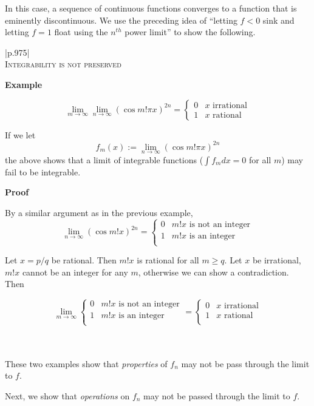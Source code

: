 \documentclass{article}
\newenvironment{myboxed}{\bigskip\noindent\begin{tabular}{|p{.975\textwidth}|}\hline \\}{\\\\\hline\end{tabular}\bigskip}
\begin{document}
In this case, a sequence of continuous functions converges to a function that is eminently discontinuous. We use the preceding idea of ``letting $f < 0$ sink and letting $f = 1$ float using the $n^{th}$ power limit'' to show the following.

\begin{myboxed}
    \textsc{Integrability is not preserved}

    \textbf{Example}

    \[\lim_{m \to \infty} \lim_{n \to \infty} (\cos m!\pi x ) ^{2n} = \begin{cases}
        0 & x\text{ irrational} \\
        1 & x\text{ rational}
    \end{cases}\]

    If we let 
    \[f_m (x) := \lim_{n \to \infty} (\cos m!\pi x)^{2n}\]
    the above shows that a limit of integrable functions ($\int f_m dx = 0$ for all $m$) may fail to be integrable.

    \textbf{Proof}

    By a similar argument as in the previous example,
    \[\lim_{n \to \infty} (\cos m!x)^{2n} = \begin{cases}
        0 & m!x\text{ is not an integer} \\
        1 & m!x\text{ is an integer} \\
    \end{cases}\]

    Let $x = p/q$ be rational. Then $m!x$ is rational for all $m \geq q$. Let $x$ be irrational, $m!x$ cannot be an integer for any $m$, otherwise we can show a contradiction. Then

    \[\lim_{m \to \infty} \begin{cases}
        0 & m!x\text{ is not an integer} \\
        1 & m!x\text{ is an integer} \\
        \end{cases} = \begin{cases}
        0 & x \text{ irrational} \\
        1 & x \text{ rational} \\
    \end{cases}\]
\end{myboxed}

These two examples show that \textit{properties} of $f_n$ may not be pass through the limit to $f$. 

Next, we show that \textit{operations} on $f_n$ may not be passed through the limit to $f$.
\end{document}
